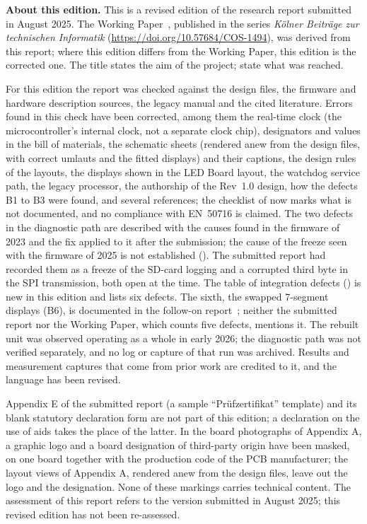\documentclass[12pt,ngerman,english,openany]{book}
\begin{document}
{
	\footnotesize
	\setlength{\parskip}{0.5em}
	\setlength{\parindent}{0pt}
	\textbf{About this edition.} This is a revised edition of the research report submitted in August 2025. The Working Paper~\cite{torun2026}, published in the series \emph{Kölner Beiträge zur technischen Informatik} (\url{https://doi.org/10.57684/COS-1494}), was derived from this report; where this edition differs from the Working Paper, this edition is the corrected one. The title states the aim of the project;  state what was reached.

	For this edition the report was checked against the design files, the firmware and hardware description sources, the legacy manual and the cited literature. Errors found in this check have been corrected, among them the real-time clock (the microcontroller's internal clock, not a separate clock chip), designators and values in the bill of materials, the schematic sheets (rendered anew from the design files, with correct umlauts and the fitted displays) and their captions, the design rules of the layouts, the displays shown in the LED Board layout, the watchdog service path, the legacy processor, the authorship of the Rev~1.0 design, how the defects B1 to B3 were found, and several references; the checklist of  now marks what is not documented, and no compliance with EN~50716 is claimed. The two defects in the diagnostic path are described with the causes found in the firmware of 2023 and the fix applied to it after the submission; the cause of the freeze seen with the firmware of 2025 is not established (). The submitted report had recorded them as a freeze of the SD-card logging and a corrupted third byte in the SPI transmission, both open at the time. The table of integration defects () is new in this edition and lists six defects. The sixth, the swapped 7-segment displays (B6), is documented in the follow-on report~\cite[p.~13]{savchuk2025}; neither the submitted report nor the Working Paper, which counts five defects, mentions it. The rebuilt unit was observed operating as a whole in early 2026; the diagnostic path was not verified separately, and no log or capture of that run was archived. Results and measurement captures that come from prior work are credited to it, and the language has been revised.

	Appendix E of the submitted report (a sample \enquote{Prüfzertifikat} template) and its blank statutory declaration form are not part of this edition; a declaration on the use of aids takes the place of the latter. In the board photographs of Appendix A, a graphic logo and a board designation of third-party origin have been masked, on one board together with the production code of the PCB manufacturer; the layout views of Appendix A, rendered anew from the design files, leave out the logo and the designation. None of these markings carries technical content. The assessment of this report refers to the version submitted in August 2025; this revised edition has not been re-assessed.

}
\end{document}

